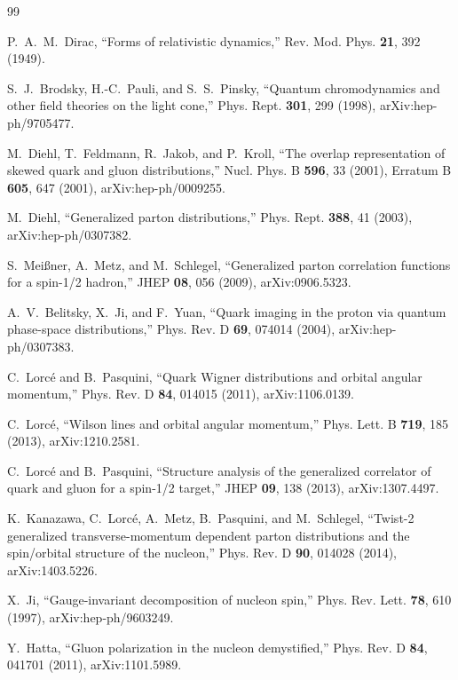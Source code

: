 \documentclass[11pt]{article}
\begin{document}
\small
\begin{thebibliography}{99}

P.~A.~M.~Dirac,
``Forms of relativistic dynamics,''
Rev. Mod. Phys. \textbf{21}, 392 (1949).

S.~J.~Brodsky, H.-C.~Pauli, and S.~S.~Pinsky,
``Quantum chromodynamics and other field theories on the light cone,''
Phys. Rept. \textbf{301}, 299 (1998),
arXiv:hep-ph/9705477.

M.~Diehl, T.~Feldmann, R.~Jakob, and P.~Kroll,
``The overlap representation of skewed quark and gluon distributions,''
Nucl. Phys. B \textbf{596}, 33 (2001), Erratum B \textbf{605}, 647 (2001),
arXiv:hep-ph/0009255.

M.~Diehl,
``Generalized parton distributions,''
Phys. Rept. \textbf{388}, 41 (2003),
arXiv:hep-ph/0307382.

S.~Mei{\ss}ner, A.~Metz, and M.~Schlegel,
``Generalized parton correlation functions for a spin-1/2 hadron,''
JHEP \textbf{08}, 056 (2009),
arXiv:0906.5323.

A.~V.~Belitsky, X.~Ji, and F.~Yuan,
``Quark imaging in the proton via quantum phase-space distributions,''
Phys. Rev. D \textbf{69}, 074014 (2004),
arXiv:hep-ph/0307383.

C.~Lorc\'e and B.~Pasquini,
``Quark Wigner distributions and orbital angular momentum,''
Phys. Rev. D \textbf{84}, 014015 (2011),
arXiv:1106.0139.

C.~Lorc\'e,
``Wilson lines and orbital angular momentum,''
Phys. Lett. B \textbf{719}, 185 (2013),
arXiv:1210.2581.

C.~Lorc\'e and B.~Pasquini,
``Structure analysis of the generalized correlator of quark and gluon for a
spin-1/2 target,''
JHEP \textbf{09}, 138 (2013),
arXiv:1307.4497.

K.~Kanazawa, C.~Lorc\'e, A.~Metz, B.~Pasquini, and M.~Schlegel,
``Twist-2 generalized transverse-momentum dependent parton distributions and
the spin/orbital structure of the nucleon,''
Phys. Rev. D \textbf{90}, 014028 (2014),
arXiv:1403.5226.

X.~Ji,
``Gauge-invariant decomposition of nucleon spin,''
Phys. Rev. Lett. \textbf{78}, 610 (1997),
arXiv:hep-ph/9603249.

Y.~Hatta,
``Gluon polarization in the nucleon demystified,''
Phys. Rev. D \textbf{84}, 041701 (2011),
arXiv:1101.5989.


\end{thebibliography}
\end{document}
